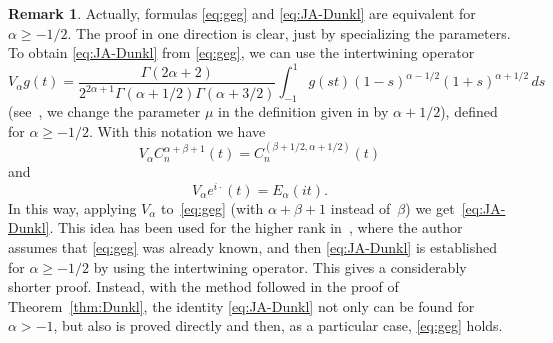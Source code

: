 \documentclass[11pt,a4paper]{amsart}
\theoremstyle{plain}
\theoremstyle{definition}
\newtheorem{Rem}{Remark}
\begin{document}
\begin{Rem}
\label{rem:Rosler}
Actually, formulas \eqref{eq:geg} and \eqref{eq:JA-Dunkl} are equivalent for $\alpha\ge -1/2$. The proof in one direction is clear, just by specializing the parameters. To obtain \eqref{eq:JA-Dunkl} from \eqref{eq:geg}, we can use the intertwining operator
\begin{equation*}
  V_\alpha g(t) = \frac{\Gamma(2\alpha+2)}{2^{2\alpha+1} \Gamma(\alpha+1/2)\Gamma(\alpha+3/2)}
  \int_{-1}^1 g(st) (1-s)^{\alpha-1/2} (1+s)^{\alpha+1/2}\,ds
\end{equation*}
(see~\cite[Definition~1.5.1, p.~24]{DX}, we change the parameter $\mu$ in the definition given in \cite{DX} by $\alpha+1/2$), defined for $\alpha\ge -1/2$. With this notation we have
\begin{equation}
\label{eq:VaCn}
  V_\alpha C_n^{\alpha+\beta+1}(t) = C_n^{(\beta+1/2,\alpha+1/2)}(t)
\end{equation}
and
\begin{equation*}
  V_\alpha e^{i\cdot}(t) = E_\alpha(it).
\end{equation*}
In this way, applying $V_\alpha$ to~\eqref{eq:geg} (with $\alpha+\beta+1$ instead of~$\beta$) we get~\eqref{eq:JA-Dunkl}.
This idea has been used for the higher rank in~\cite{Rosler}, where the author assumes that \eqref{eq:geg} was already known, and then \eqref{eq:JA-Dunkl} is established for $\alpha\ge -1/2$ by using the intertwining operator. This gives a considerably shorter proof. Instead, with the method followed in the proof of Theorem~\ref{thm:Dunkl}, the identity \eqref{eq:JA-Dunkl} not only can be found for $\alpha>-1$, but also is proved directly and then, as a particular case, \eqref{eq:geg} holds.
\end{Rem}
\end{document}
